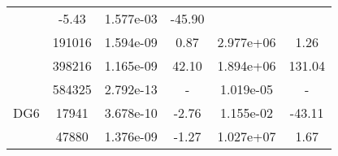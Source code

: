 \begin{table}
\begin{center}
{\begin{tabular}{| l | c | c | c | c | c |}
                &-5.43
                
                &1.577e-03
                
                &-45.90\\
                
            &191016
            
                &1.594e-09
                
                &0.87
                
                &2.977e+06
                
                &1.26\\
                
            &398216
            
                &1.165e-09
                
                &42.10
                
                &1.894e+06
                
                &131.04\\
                
            &584325
            
                &2.792e-13
                
                &-
                
                &1.019e-05
                
                &-\\
                \hline
        \hline
        \hspace{0.1cm}DG6\hspace{0.1cm}    
        
            &17941
            
                &3.678e-10
                
                &-2.76
                
                &1.155e-02
                
                &-43.11\\
                
            &47880
            
                &1.376e-09
                
                &-1.27
                
                &1.027e+07
                
                &1.67\\
                

\end{tabular}}
\end{center}
\end{table}
